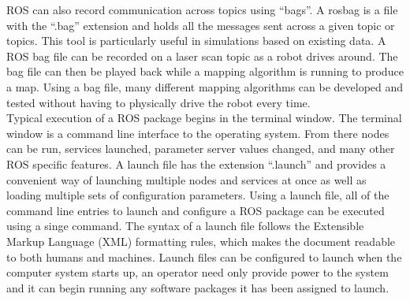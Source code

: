 ROS can also record communication across topics using ``bags''. A rosbag is a file with the ``.bag'' extension and holds all the messages sent across a given topic or topics. This tool is particularly useful in simulations based on existing data. A ROS bag file can be recorded on a laser scan topic as a robot drives around. The bag file can then be played back while a mapping algorithm is running to produce a map. Using a bag file, many different mapping algorithms can be developed and tested without having to physically drive the robot every time.\\

Typical execution of a ROS package begins in the terminal window. The terminal window is a command line interface to the operating system. From there nodes can be run, services launched, parameter server values changed, and many other ROS specific features. A launch file has the extension ``.launch'' and provides a convenient way of launching multiple nodes and services at once as well as loading multiple sets of configuration parameters. Using a launch file, all of the command line entries to launch and configure a ROS package can be executed using a singe command. The syntax of a launch file follows the Extensible Markup Language (XML) formatting rules, which makes the document readable to both humans and machines. Launch files can be configured to launch when the computer system starts up, an operator need only provide power to the system and it can begin running any software packages it has been assigned to launch.\\
